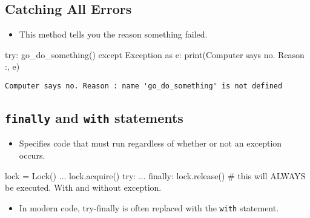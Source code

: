\documentclass[
  letterpaper,
  DIV=11,
  numbers=noendperiod]{scrreprt}
\newenvironment{Shaded}{\begin{snugshade}}{\end{snugshade}}
\newcommand{\BuiltInTok}[1]{\textcolor[rgb]{0.00,0.46,0.62}{#1}}
\newcommand{\CommentTok}[1]{\textcolor[rgb]{0.37,0.37,0.37}{#1}}
\newcommand{\ControlFlowTok}[1]{\textcolor[rgb]{0.00,0.46,0.62}{#1}}
\newcommand{\ImportTok}[1]{\textcolor[rgb]{0.00,0.46,0.62}{#1}}
\newcommand{\NormalTok}[1]{\textcolor[rgb]{0.00,0.46,0.62}{#1}}
\newcommand{\OperatorTok}[1]{\textcolor[rgb]{0.37,0.37,0.37}{#1}}
\newcommand{\PreprocessorTok}[1]{\textcolor[rgb]{0.68,0.00,0.00}{#1}}
\newcommand{\StringTok}[1]{\textcolor[rgb]{0.13,0.47,0.30}{#1}}
\providecommand{\tightlist}{%
  \setlength{\itemsep}{0pt}\setlength{\parskip}{0pt}}
\begin{document}
\hypertarget{catching-all-errors}{%
\subsection{Catching All Errors}\label{catching-all-errors}}

\begin{itemize}
\tightlist
\item
  This method tells you the reason something failed.
\end{itemize}

\begin{Shaded}
\begin{Highlighting}[]
\ControlFlowTok{try}\NormalTok{:}
\NormalTok{    go\_do\_something()}
\ControlFlowTok{except} \PreprocessorTok{Exception} \ImportTok{as}\NormalTok{ e:}
    \BuiltInTok{print}\NormalTok{(}\StringTok{\textquotesingle{}Computer says no. Reason :\textquotesingle{}}\NormalTok{, e)}
\end{Highlighting}
\end{Shaded}

\begin{verbatim}
Computer says no. Reason : name 'go_do_something' is not defined
\end{verbatim}

\hypertarget{finally-and-with-statements}{%
\subsection{\texorpdfstring{\texttt{finally} and \texttt{with}
statements}{finally and with statements}}\label{finally-and-with-statements}}

\begin{itemize}
\tightlist
\item
  Specifies code that must run regardless of whether or not an exception
  occurs.
\end{itemize}

\begin{Shaded}
\begin{Highlighting}[]
\NormalTok{lock }\OperatorTok{=}\NormalTok{ Lock()}
\NormalTok{...}
\NormalTok{lock.acquire()}
\ControlFlowTok{try}\NormalTok{:}
\NormalTok{    ...}
\ControlFlowTok{finally}\NormalTok{:}
\NormalTok{    lock.release()  }\CommentTok{\# this will ALWAYS be executed. With and without exception.}
\end{Highlighting}
\end{Shaded}

\begin{itemize}
\tightlist
\item
  In modern code, try-finally is often replaced with the \texttt{with}
  statement.
\end{itemize}
\end{document}
